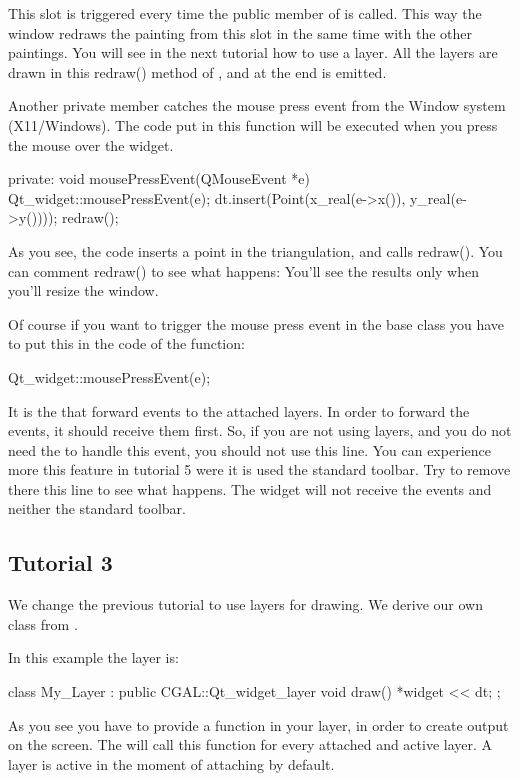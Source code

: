 This slot is triggered every time the 
public member of  is called. This way the window
redraws the painting from this slot in the same time with the other
paintings. You will see in the next tutorial how to use a layer. All
the layers are drawn in this redraw() method of , and
at the end  is emitted.

Another private member catches the mouse press event from the Window
system (X11/Windows). The code put in this function will be executed when
you press the mouse over the widget.
\begin{ccExampleCode}
private:
  void mousePressEvent(QMouseEvent *e)
  {
    Qt_widget::mousePressEvent(e);
    dt.insert(Point(x_real(e->x()), y_real(e->y())));
    redraw();
  }
\end{ccExampleCode}
As you see, the code inserts a point in the triangulation, and calls
redraw(). You can comment redraw() to see what happens: You'll see
the results only when you'll resize the window.
\begin{ccAdvanced}
Of course if you want to trigger the mouse press event in the base
class you have to put this in the code of the function:
\begin{ccExampleCode}
Qt_widget::mousePressEvent(e);
\end{ccExampleCode}
It is the  that forward events to the attached
layers. In order to forward the events, it should receive them
first. So, if you are not using layers, and you do not need the
 to handle this event, you should not use this line.
You can experience more this feature in tutorial 5 were it is used the
standard toolbar. Try to remove there this line to see what
happens. The widget will not receive the events and neither the
standard toolbar.
\end{ccAdvanced}

\subsection*{Tutorial 3}

We change the previous tutorial to use layers for drawing. We derive
our own class from .

In this example the layer is:
\begin{ccExampleCode}
class My_Layer : public CGAL::Qt_widget_layer{
  void draw(){
    *widget << dt;
  }
};
\end{ccExampleCode}
As you see you have to provide a  function in your layer, in
order to create output on the screen. The  will call this
 function for every attached and active layer. A layer is active
in the moment of attaching by default.

